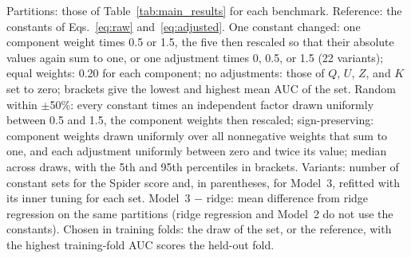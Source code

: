 \begin{table}[!t]
\par\vspace{2pt}\parbox{0.96\textwidth}{\scriptsize Partitions: those of Table~\ref{tab:main_results} for each benchmark. Reference: the constants
of Eqs.~\eqref{eq:raw} and~\eqref{eq:adjusted}. One constant changed: one component weight times 0.5 or 1.5, the five then rescaled so that
their absolute values again sum to one, or one adjustment times 0, 0.5, or 1.5 (22 variants); equal weights: 0.20 for each component;
no adjustments: those of $Q$, $U$, $Z$, and $K$ set to zero; brackets give the lowest and highest mean AUC of the set. Random within
$\pm$50\%: every constant times an independent factor drawn uniformly between 0.5 and 1.5, the component weights then rescaled;
sign-preserving: component weights drawn uniformly over all nonnegative weights that sum to one, and each adjustment uniformly between
zero and twice its value; median across draws, with the 5th and 95th percentiles in brackets. Variants: number of constant sets for the
Spider score and, in parentheses, for Model~3, refitted with its inner tuning for each set. Model~3 $-$ ridge: mean difference from
ridge regression on the same partitions (ridge regression and Model~2 do not use the constants). Chosen in training folds: the draw
of the set, or the reference, with the highest training-fold AUC scores the held-out fold.}
\end{table}
